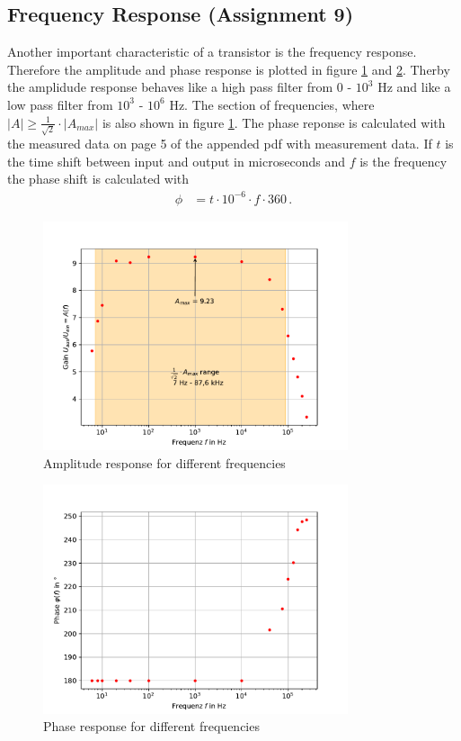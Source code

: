\documentclass[11pt, a4paper]{article}
\begin{document}
\FloatBarrier
\subsection{Frequency Response (Assignment 9)}
Another important characteristic of a transistor is the frequency response. Therefore the amplitude and phase response is plotted in figure \ref{fig:Ampresp} and \ref{fig:Pharesp}.
Therby the amplidude response behaves like a high pass filter from 0 - $10^3$ \si{\hertz} and like a low pass filter from $10^3$ - $10^6$ \si{\hertz}.
The section of frequencies, where $\left\lvert A \right\rvert \geq \frac{1}{\sqrt{2}}  \cdot \left\lvert A_{max} \right\lvert$ is also shown in figure \ref{fig:Ampresp}. The phase reponse is calculated with the measured data on page 5 of the appended pdf with measurement data. If $t$ is the time shift between input and output in microseconds and $f$ is the frequency the phase shift is calculated with
\begin{align}
    \phi &= t \cdot 10^{-6} \cdot f \cdot 360 \,.
\end{align}



\begin{figure}[h]
    \centering
    \includegraphics[width=0.8\textwidth]{plots/Amplitudengang.pdf}
    \caption{Amplitude response for different frequencies}
    \label{fig:Ampresp}
\end{figure}

\begin{figure}[h]
    \centering
    \includegraphics[width=0.8\textwidth]{plots/Phasengang.pdf}
    \caption{Phase response for different frequencies}
    \label{fig:Pharesp}
\end{figure}
\end{document}
